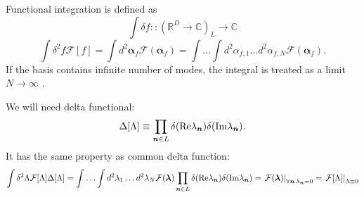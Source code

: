 Functional integration is defined as
\[
	\int \delta f ::
	(\mathbb{R}^D \rightarrow \mathbb{C})_L	\rightarrow \mathbb{C}
\]
\[
	\int \delta^2 f \mathcal{F}[f]
	= \int d^2\bm{\alpha}_f \mathcal{F}(\bm{\alpha}_f)
	= \int \ldots \int d^2\alpha_{f,1} \ldots d^2\alpha_{f,N} \mathcal{F}(\bm{\alpha}_f).
\]
If the basis contains infinite number of modes, the integral is treated as a limit $N \rightarrow \infty$ .

We will need delta functional:
\[
	\Delta[\Lambda]
	\equiv \prod_{\boldsymbol{n} \in L} \delta(\mathrm{Re} \lambda_{\boldsymbol{n}}) \delta(\mathrm{Im} \lambda_{\boldsymbol{n}}).
\]
It has the same property as common delta function:
\[
	\int \delta^2 \Lambda \mathcal{F}[\Lambda] \Delta[\Lambda]
	= \int \ldots \int d^2\lambda_1 \ldots d^2\lambda_N \mathcal{F}(\bm{\lambda})
		\prod_{\boldsymbol{n} \in L} \delta(\mathrm{Re} \lambda_{\boldsymbol{n}}) \delta(\mathrm{Im} \lambda_{\boldsymbol{n}})
	= \left. \mathcal{F}(\bm{\lambda}) \right|_{\forall \boldsymbol{n}\, \lambda_{\boldsymbol{n}} = 0}
	= \left. \mathcal{F}[\Lambda] \right|_{\Lambda \equiv 0}
\]

